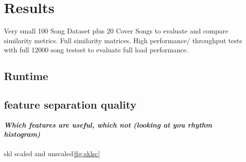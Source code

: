 
\chapter{Results}\label{bds2}

Very small 100 Song Dataset plus 20 Cover Songs to evaluate and compare similarity metrics. Full similarity matrices. 
High performance/ throughput tests with full 12000 song testset to evaluate full load performance.\\

\section{Runtime}

\section{feature separation quality}

\textit{\textbf{Which features are useful, which not (looking at you rhythm histogram)\\}}
\\

\noindent skl scaled and unscaled\ref{fig:sklsc}\\

